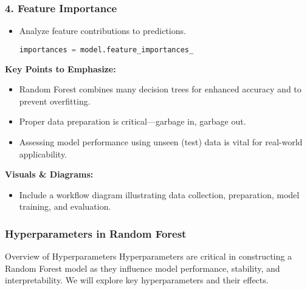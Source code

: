 \documentclass[aspectratio=169]{beamer}
\begin{document}
\begin{frame}[fragile]
    \frametitle{4. Feature Importance}
    \begin{itemize}
        \item Analyze feature contributions to predictions.
        \begin{lstlisting}[language=Python]
importances = model.feature_importances_
        \end{lstlisting}
    \end{itemize}

    \textbf{Key Points to Emphasize:}
    \begin{itemize}
        \item Random Forest combines many decision trees for enhanced accuracy and to prevent overfitting.
        \item Proper data preparation is critical—garbage in, garbage out.
        \item Assessing model performance using unseen (test) data is vital for real-world applicability.
    \end{itemize}

    \textbf{Visuals \& Diagrams:}
    \begin{itemize}
        \item Include a workflow diagram illustrating data collection, preparation, model training, and evaluation.
    \end{itemize}
\end{frame}

\begin{frame}[fragile]
    \frametitle{Hyperparameters in Random Forest}
    \begin{block}{Overview of Hyperparameters}
        Hyperparameters are critical in constructing a Random Forest model as they influence model performance, stability, and interpretability. We will explore key hyperparameters and their effects.
    \end{block}
\end{frame}
\end{document}
